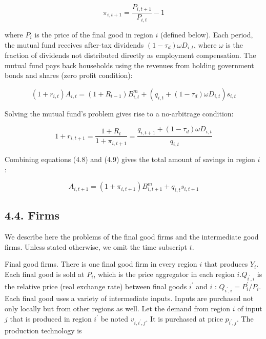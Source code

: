 \documentclass[10pt]{article}
\begin{document}
\begin{equation*}
\pi_{i, t+1}=\frac{P_{i, t+1}}{P_{i, t}}-1 \tag{4.7}
\end{equation*}


where $P_{i}$ is the price of the final good in region $i$ (defined below). Each period, the mutual fund receives after-tax dividends $\left(1-\tau_{d}\right) \omega D_{i, t}$, where $\omega$ is the fraction of dividends not distributed directly as employment compensation. The mutual fund pays back households using the revenues from holding government bonds and shares (zero profit condition):


\begin{equation*}
\left(1+r_{i, t}\right) A_{i, t}=\left(1+R_{t-1}\right) B_{i, t}^{m}+\left(q_{i, t}+\left(1-\tau_{d}\right) \omega D_{i, t}\right) s_{i, t} \tag{4.8}
\end{equation*}


Solving the mutual fund's problem gives rise to a no-arbitrage condition:


\begin{equation*}
1+r_{i, t+1}=\frac{1+R_{t}}{1+\pi_{i, t+1}}=\frac{q_{i, t+1}+\left(1-\tau_{d}\right) \omega D_{i, t}}{q_{i, t}} \tag{4.9}
\end{equation*}


Combining equations (4.8) and (4.9) gives the total amount of savings in region $i$ :


\begin{equation*}
A_{i, t+1}=\left(1+\pi_{i, t+1}\right) B_{i, t+1}^{m}+q_{i, t} s_{i, t+1} \tag{4.10}
\end{equation*}


\subsection*{4.4. Firms}
We describe here the problems of the final good firms and the intermediate good firms. Unless stated otherwise, we omit the time subscript $t$.

Final good firms. There is one final good firm in every region $i$ that produces $Y_{i}$. Each final good is sold at $P_{i}$, which is the price aggregator in each region $i . Q_{i^{\prime}, i}$ is the relative price (real exchange rate) between final goods $i^{\prime}$ and $i$ : $Q_{i^{\prime}, i}=P_{i}^{\prime} / P_{i}$. Each final good uses a variety of intermediate inputs. Inputs are purchased not only locally but from other regions as well. Let the demand from region $i$ of input $j$ that is produced in region $i^{\prime}$ be noted $v_{i, i^{\prime}, j}$. It is purchased at price $p_{i^{\prime}, j}$. The production technology is
\end{document}
